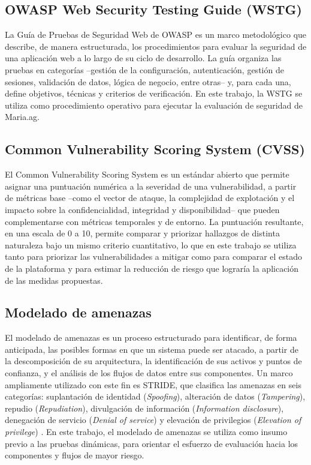 \documentclass[12pt,letterpaper]{report}
\begin{document}
\subsection*{OWASP Web Security Testing Guide (WSTG)}
La Guía de Pruebas de Seguridad Web de OWASP \autocite{owasp2024wstg} es un
marco metodológico que describe, de manera estructurada, los procedimientos
para evaluar la seguridad de una aplicación web a lo largo de su ciclo de
desarrollo. La guía organiza las pruebas en categorías --gestión de la
configuración, autenticación, gestión de sesiones, validación de datos,
lógica de negocio, entre otras-- y, para cada una, define objetivos, técnicas
y criterios de verificación. En este trabajo, la WSTG se utiliza como
procedimiento operativo para ejecutar la evaluación de seguridad de
Maria.ag.

\subsection*{Common Vulnerability Scoring System (CVSS)}
El Common Vulnerability Scoring System \autocite{first2023cvss} es un
estándar abierto que permite asignar una puntuación numérica a la severidad
de una vulnerabilidad, a partir de métricas base --como el vector de ataque,
la complejidad de explotación y el impacto sobre la confidencialidad,
integridad y disponibilidad-- que pueden complementarse con métricas
temporales y de entorno. La puntuación resultante, en una escala de 0 a 10,
permite comparar y priorizar hallazgos de distinta naturaleza bajo un mismo
criterio cuantitativo, lo que en este trabajo se utiliza tanto para priorizar
las vulnerabilidades a mitigar como para comparar el estado de la plataforma
y para estimar la reducción de riesgo que lograría la aplicación de las medidas
propuestas.

\subsection*{Modelado de amenazas}
El modelado de amenazas es un proceso estructurado para identificar, de forma
anticipada, las posibles formas en que un sistema puede ser atacado, a partir
de la descomposición de su arquitectura, la identificación de sus activos y
puntos de confianza, y el análisis de los flujos de datos entre sus
componentes. Un marco ampliamente utilizado con este fin es STRIDE, que
clasifica las amenazas en seis categorías: suplantación de identidad
(\textit{Spoofing}), alteración de datos (\textit{Tampering}), repudio
(\textit{Repudiation}), divulgación de información (\textit{Information
disclosure}), denegación de servicio (\textit{Denial of service}) y elevación
de privilegios (\textit{Elevation of privilege}) \autocite{shostack2014}. En
este trabajo, el modelado de amenazas se utiliza como insumo previo a las
pruebas dinámicas, para orientar el esfuerzo de evaluación hacia los
componentes y flujos de mayor riesgo.
\end{document}
